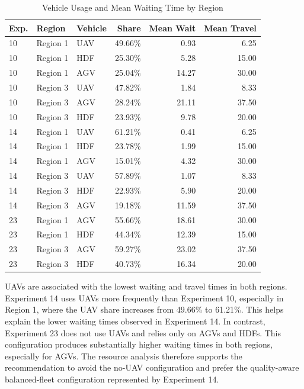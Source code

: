 \documentclass[conference]{IEEEtran}
\begin{document}
\begin{table}[t]
\caption{Vehicle Usage and Mean Waiting Time by Region}
\label{tab:vehicle-resource}
\centering
\begin{tabular}{|l|l|l|r|r|r|}
\hline
\textbf{Exp.} & \textbf{Region} & \textbf{Vehicle} & \textbf{Share} & \textbf{Mean Wait} & \textbf{Mean Travel} \\
\hline
10 & Region 1 & UAV & 49.66\% & 0.93 & 6.25 \\
10 & Region 1 & HDF & 25.30\% & 5.28 & 15.00 \\
10 & Region 1 & AGV & 25.04\% & 14.27 & 30.00 \\
\hline
10 & Region 3 & UAV & 47.82\% & 1.84 & 8.33 \\
10 & Region 3 & AGV & 28.24\% & 21.11 & 37.50 \\
10 & Region 3 & HDF & 23.93\% & 9.78 & 20.00 \\
\hline
14 & Region 1 & UAV & 61.21\% & 0.41 & 6.25 \\
14 & Region 1 & HDF & 23.78\% & 1.99 & 15.00 \\
14 & Region 1 & AGV & 15.01\% & 4.32 & 30.00 \\
\hline
14 & Region 3 & UAV & 57.89\% & 1.07 & 8.33 \\
14 & Region 3 & HDF & 22.93\% & 5.90 & 20.00 \\
14 & Region 3 & AGV & 19.18\% & 11.59 & 37.50 \\
\hline
23 & Region 1 & AGV & 55.66\% & 18.61 & 30.00 \\
23 & Region 1 & HDF & 44.34\% & 12.39 & 15.00 \\
\hline
23 & Region 3 & AGV & 59.27\% & 23.02 & 37.50 \\
23 & Region 3 & HDF & 40.73\% & 16.34 & 20.00 \\
\hline
\end{tabular}
\end{table}

UAVs are associated with the lowest waiting and travel times in both regions. Experiment 14 uses UAVs more frequently than Experiment 10, especially in Region 1, where the UAV share increases from 49.66\% to 61.21\%. This helps explain the lower waiting times observed in Experiment 14. In contrast, Experiment 23 does not use UAVs and relies only on AGVs and HDFs. This configuration produces substantially higher waiting times in both regions, especially for AGVs. The resource analysis therefore supports the recommendation to avoid the no-UAV configuration and prefer the quality-aware balanced-fleet configuration represented by Experiment 14.
\end{document}
